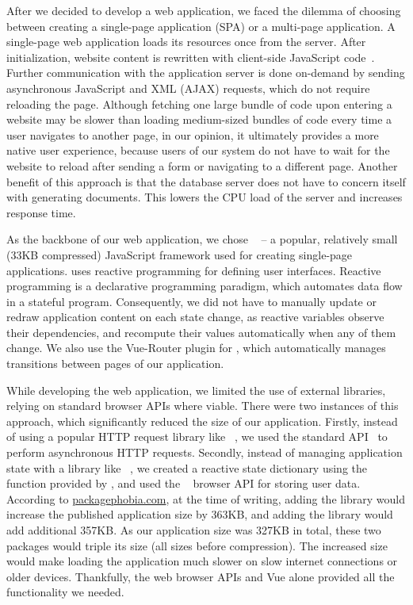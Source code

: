 After we decided to develop a web application, we faced the dilemma of choosing between creating a single-page application (SPA) or a multi-page application. A single-page web application loads its resources once from the server. After initialization, website content is rewritten with client-side JavaScript code~\cite{Flanagan2014SinglePageApp}. Further communication with the application server is done on-demand by sending asynchronous JavaScript and XML (AJAX) requests, which do not require reloading the page. Although fetching one large bundle of code upon entering a website may be slower than loading medium-sized bundles of code every time a user navigates to another page, in our opinion, it ultimately provides a more native user experience, because users of our system do not have to wait for the website to reload after sending a form or navigating to a different page. Another benefit of this approach is that the database server does not have to concern itself with generating  documents. This lowers the CPU load of the server and increases response time.

As the backbone of our web application, we chose ~\cite{vuejs} -- a popular, relatively small (33KB compressed) JavaScript framework used for creating single-page applications.  uses reactive programming for defining user interfaces. Reactive programming is a declarative programming paradigm, which automates data flow in a stateful program. Consequently, we did not have to manually update or redraw application content on each state change, as reactive variables observe their dependencies, and recompute their values automatically when any of them change. We also use the Vue-Router plugin for , which automatically manages transitions between pages of our application.

While developing the web application, we limited the use of external libraries, relying on standard browser APIs where viable. There were two instances of this approach, which significantly reduced the size of our application. Firstly, instead of using a popular HTTP request library like ~\cite{axios}, we used the standard  API~\cite{mozilla_fetch} to perform asynchronous HTTP requests. Secondly, instead of managing application state with a library like ~\cite{vuex}, we created a reactive state dictionary using the  function provided by , and used the ~\cite{mozilla_fetch} browser API for storing user data. According to \url{packagephobia.com}, at the time of writing, adding the  library would increase the published application size by 363KB, and adding the  library would add additional 357KB.  As our application size was 327KB in total, these two packages would triple its size (all sizes before compression). The increased size would make loading the application much slower on slow internet connections or older devices. Thankfully, the web browser APIs and Vue alone provided all the functionality we needed.

